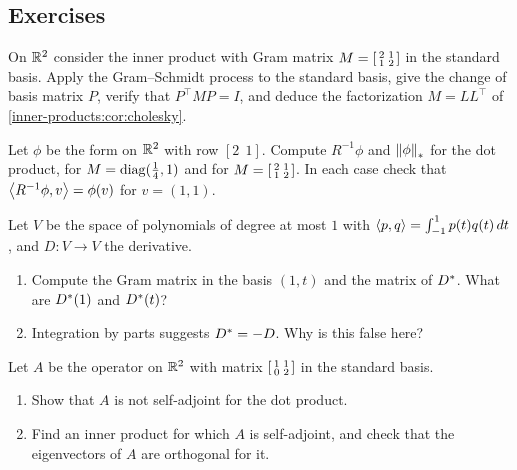 \begin{notechapter}
\section*{Exercises}

\begin{exercise}\label{inner-products:exr:1}
On $\mathbb{R}^2$ consider the inner product with Gram matrix
$M = \begin{bsmallmatrix}2 & 1\\1 & 2\end{bsmallmatrix}$ in the standard
basis. Apply the Gram--Schmidt process to the standard basis, give the
change of basis matrix $P$, verify that $P^\top MP = I$, and deduce the
factorization $M = LL^\top$ of \cref{inner-products:cor:cholesky}.
\end{exercise}

\begin{exercise}\label{inner-products:exr:2}
Let $\phi$ be the form on $\mathbb{R}^2$ with row $[2\ \ 1]$. Compute
$R^{-1}\phi$ and $\left\|\phi\right\|_*$ for the dot product, for
$M = \operatorname{diag}(\frac14, 1)$ and for
$M = \begin{bsmallmatrix}2 & 1\\1 & 2\end{bsmallmatrix}$. In each case
check that $\left\langle R^{-1}\phi, v \right\rangle = \phi(v)$ for $v = (1, 1)$.
\end{exercise}

\begin{exercise}\label{inner-products:exr:3}
Let $V$ be the space of polynomials of degree at most $1$ with
$\left\langle p, q \right\rangle = \int_{-1}^1p(t)q(t)\,dt$, and $D:V\to V$ the derivative.
\begin{enumerate}[nosep]
  \item Compute the Gram matrix in the basis $(1, t)$ and the matrix of
        $D^{*}$. What are $D^{*}(1)$ and $D^{*}(t)$?
  \item Integration by parts suggests $D^{*} = -D$. Why is this false
        here?
\end{enumerate}
\end{exercise}

\begin{exercise}\label{inner-products:exr:4}
Let $A$ be the operator on $\mathbb{R}^2$ with matrix
$\begin{bsmallmatrix}1 & 1\\0 & 2\end{bsmallmatrix}$ in the standard basis.
\begin{enumerate}[nosep]
  \item Show that $A$ is not self-adjoint for the dot product.
  \item Find an inner product for which $A$ is self-adjoint, and check
        that the eigenvectors of $A$ are orthogonal for it.
\end{enumerate}
\end{exercise}


\end{notechapter}
